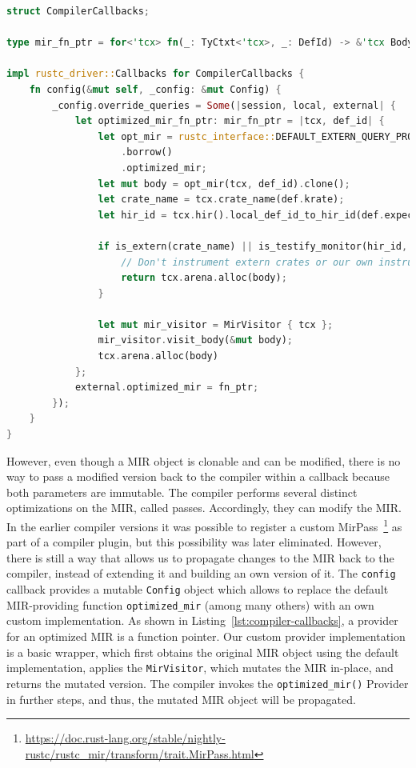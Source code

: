 \documentclass{article}
\begin{document}
\begin{lstlisting}[language=Rust, style=boxed, caption={The Rust compiler interface accepts an object which implements its callback trait, allowing us to execute code at different compilation phases}, label=lst:compiler-callbacks]
struct CompilerCallbacks;

type mir_fn_ptr = for<'tcx> fn(_: TyCtxt<'tcx>, _: DefId) -> &'tcx Body<'tcx>;

impl rustc_driver::Callbacks for CompilerCallbacks {
    fn config(&mut self, _config: &mut Config) {
        _config.override_queries = Some(|session, local, external| {
            let optimized_mir_fn_ptr: mir_fn_ptr = |tcx, def_id| {
                let opt_mir = rustc_interface::DEFAULT_EXTERN_QUERY_PROVIDERS
                    .borrow()
                    .optimized_mir;
                let mut body = opt_mir(tcx, def_id).clone();
                let crate_name = tcx.crate_name(def.krate);
                let hir_id = tcx.hir().local_def_id_to_hir_id(def.expect_local());

                if is_extern(crate_name) || is_testify_monitor(hir_id, &tcx) {
                    // Don't instrument extern crates or our own instrumentation code
                    return tcx.arena.alloc(body);
                }

                let mut mir_visitor = MirVisitor { tcx };
                mir_visitor.visit_body(&mut body);
                tcx.arena.alloc(body)
            };
            external.optimized_mir = fn_ptr;
        });
    }
}
\end{lstlisting}
However, even though a \ac{MIR} object is clonable and can be modified, there is no way to pass a modified version back to the compiler within a callback because both parameters are immutable. The compiler performs several distinct optimizations on the MIR, called passes. Accordingly, they can modify the MIR. In the earlier compiler versions it was possible to register a custom MirPass~\footnote{\url{https://doc.rust-lang.org/stable/nightly-rustc/rustc_mir/transform/trait.MirPass.html}} as part of a compiler plugin, but this possibility was later eliminated. However, there is still a way that allows us to propagate changes to the MIR back to the compiler, instead of extending it and building an own version of it. The \lstinline{config} callback provides a mutable \lstinline{Config} object which allows to replace the default \ac{MIR}-providing function \lstinline{optimized_mir} (among many others) with an own custom implementation. As shown in Listing~\ref{lst:compiler-callbacks}, a provider for an optimized \ac{MIR} is a function pointer. Our custom provider implementation is a basic wrapper, which first obtains the original \ac{MIR} object using the default implementation, applies the \lstinline{MirVisitor}, which mutates the MIR in-place, and returns the mutated version. The compiler invokes the \lstinline{optimized_mir()} Provider in further steps, and thus, the mutated \ac{MIR} object will be propagated.
\end{document}

